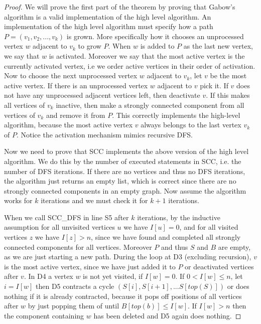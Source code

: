 \documentclass{report}
\theoremstyle{plain}
\theoremstyle{definition}
\theoremstyle{remark}
\numberwithin{definition}{chapter}
\numberwithin{example}{chapter}
\numberwithin{figure}{chapter}
\numberwithin{theorem}{chapter}
\numberwithin{lemma}{chapter}
\begin{document}
\begin{proof}
We will prove the first part of the theorem by proving that Gabow's algorithm is a valid implementation of the high level algorithm.
An implementation of the high level algorithm must specify how a path $P=(v_1,v_2,...,v_k)$ is grown. More specifically how it chooses an unprocessed vertex $w$ adjacent to $v_k$ to grow $P$. When $w$ is added to $P$ as the last new vertex, we say that $w$ is activated. Moreover we say that the most active vertex is the currently activated vertex, i.e we order active vertices in their order of activation. Now to choose the next unprocessed vertex $w$ adjacent to $v_k$, let $v$ be the most active vertex. If there is an unprocessed vertex $w$ adjacent to $v$ pick it. If $v$ does not have any unprocessed adjacent vertices left, then deactivate $v$. If this makes all vertices of $v_k$ inactive, then make a strongly connected component from all vertices of $v_k$ and remove it from $P$. This correctly implements the high-level algorithm, because the most active vertex $v$ always belongs to the last vertex $v_k$ of $P$. Notice the activation mechanism mimics recursive DFS.

Now we need to prove that SCC implements the above version of the high level algorithm. We do this by the number of executed statements in SCC, i.e. the number of DFS iterations. If there are no vertices and thus no DFS iterations, the algorithm just returns an empty list, which is correct since there are no strongly connected components in an empty graph. Now assume the algorithm works for $k$ iterations and we must check it for $k+1$ iterations.

When we call SCC\_DFS in line S5 after $k$ iterations, by the inductive assumption for all unvisited vertices $u$ we have $I[u]=0$, and for all visited vertices $z$ we have $I[z] > n$, since we have found and completed all strongly connected components for all vertices. Moreover $P$ and thus $S$ and $B$ are empty, as we are just starting a new path. During the loop at D3 (excluding recursion), $v$ is the most active vertex, since we have just added it to $P$ or deactivated vertices after $v$. In D4 a vertex $w$ is not yet visited, if $I[w]=0$. If $0 < I[w] \leq n$, let $i=I[w]$  then D5 contracts a cycle $(S[i],S[i+1],...S[top(S)])$ or does nothing if it is already contracted, because it pops off positions of all vertices after $w$ by just popping them of until $B[top(b)] \leq I[w]$. If $I[w] > n$ then the component containing $w$ has been deleted and D5 again does nothing.


\end{proof}
\end{document}
